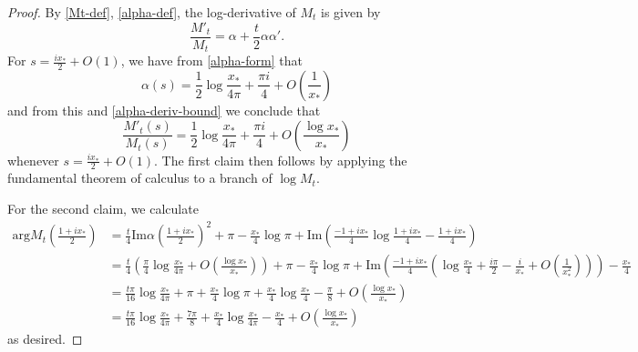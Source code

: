 \documentclass[a4paper,11pt,twoside]{amsart}
\begin{document}
\begin{proof}
By \eqref{Mt-def}, \eqref{alpha-def}, the log-derivative of $M_t$ is given by
\begin{equation}\label{mt-deriv}
 \frac{M'_t}{M_t} = \alpha + \frac{t}{2} \alpha \alpha'.
\end{equation}
For $s = \frac{ix_*}{2} + O(1)$, we have from \eqref{alpha-form} that
\begin{equation}\label{alpha-ex}
\alpha(s) = \frac{1}{2} \log \frac{x_*}{4\pi} + \frac{\pi i}{4} + O\left( \frac{1}{x_*}\right) 
\end{equation}
and from this and \eqref{alpha-deriv-bound} we conclude that
$$
 \frac{M'_t(s)}{M_t(s)} = \frac{1}{2} \log \frac{x_*}{4\pi} + \frac{\pi i}{4} + O\left( \frac{\log x_*}{x_*}\right) $$
whenever $s = \frac{ix_*}{2} + O(1)$.  The first claim then follows by applying the fundamental theorem of calculus to a branch of $\log M_t$.

For the second claim, we calculate
\begin{align*}
\mathrm{arg} M_t\left(\frac{1+ix_*}{2}\right) &= \frac{t}{4} \mathrm{Im} \alpha\left(\frac{1+ix_*}{2}\right)^2 + \pi - \frac{x_*}{4} \log \pi + \mathrm{Im}\left( \frac{-1+ix_*}{4} \log \frac{1+ix_*}{4} - \frac{1+ix_*}{4}\right) \\
&= \frac{t}{4} \left(\frac{\pi}{4} \log \frac{x_*}{4\pi} + O(\frac{\log x_*}{x_*})\right) + \pi - \frac{x_*}{4} \log \pi 
+ \mathrm{Im}\left( \frac{-1+ix_*}{4} \left(\log \frac{x_*}{4} + \frac{i\pi}{2} - \frac{i}{x_*} + O\left(\frac{1}{x_*^2}\right) \right) \right) - \frac{x_*}{4} \\
&= \frac{t \pi}{16} \log \frac{x_*}{4\pi} + \pi + \frac{x_*}{4} \log \pi 
+ \frac{x_*}{4} \log \frac{x_*}{4} - \frac{\pi}{8} + O\left( \frac{\log x_*}{x_*} \right) \\
&= \frac{t \pi}{16} \log \frac{x_*}{4\pi} + \frac{7\pi}{8} 
+ \frac{x_*}{4} \log \frac{x_*}{4\pi} - \frac{x_*}{4} + O\left( \frac{\log x_*}{x_*} \right) 
\end{align*}
as desired.
\end{proof}
\end{document}
